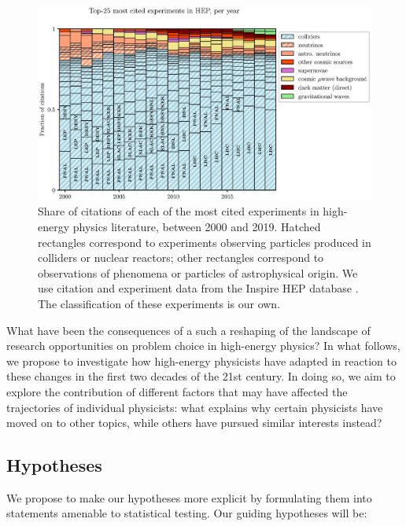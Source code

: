 \documentclass{article}
\begin{document}
\begin{figure}
    \centering
    \includegraphics[width=\textwidth]{plots/experiments.eps}
    \caption{Share of citations of each of the most cited experiments in high-energy physics literature, between 2000 and 2019. Hatched rectangles correspond to experiments observing particles produced in colliders or nuclear reactors; other rectangles correspond to observations of phenomena or particles of astrophysical origin. We use citation and experiment data from the Inspire HEP database \citep{InspireAPI}. The classification of these experiments is our own. }
    \label{fig:experiments}
\end{figure}


What have been the consequences of a such a reshaping of the landscape of research opportunities on problem choice in high-energy physics? In what follows, we propose to investigate how high-energy physicists have adapted in reaction to these changes in the first two decades of the 21st century. In doing so, we aim to explore the contribution of different factors that may have affected the trajectories of individual physicists: what explains why certain physicists have moved on to other topics, while others have pursued similar interests instead? 


\subsection{\label{sec:hypotheses}Hypotheses}

We propose to make our hypotheses more explicit by formulating them into statements amenable to statistical testing. Our guiding hypotheses will be:
\end{document}
